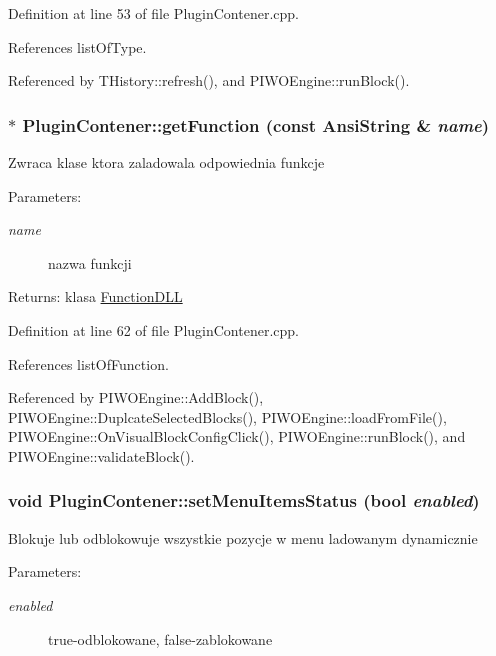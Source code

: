 Definition at line 53 of file PluginContener.cpp.

References listOfType.

Referenced by THistory::refresh(), and PIWOEngine::runBlock().\hypertarget{classPluginContener_8a9049d660fbd61f00913c580df3b314}{
\subsubsection[getFunction]{ $\ast$ PluginContener::getFunction (const AnsiString \& {\em name})}}
\label{classPluginContener_8a9049d660fbd61f00913c580df3b314}


Zwraca klase ktora zaladowala odpowiednia funkcje \begin{Desc}
\item[Parameters:]
\begin{description}
\item[{\em name}]nazwa funkcji \end{description}
\end{Desc}
\begin{Desc}
\item[Returns:]klasa \hyperlink{classFunctionDLL}{FunctionDLL} \end{Desc}


Definition at line 62 of file PluginContener.cpp.

References listOfFunction.

Referenced by PIWOEngine::AddBlock(), PIWOEngine::DuplcateSelectedBlocks(), PIWOEngine::loadFromFile(), PIWOEngine::OnVisualBlockConfigClick(), PIWOEngine::runBlock(), and PIWOEngine::validateBlock().\hypertarget{classPluginContener_e8efe6e2f12f6b67bd651c712aaf3b47}{
\subsubsection[setMenuItemsStatus]{\setlength{\rightskip}{0pt plus 5cm}void PluginContener::setMenuItemsStatus (bool {\em enabled})}}
\label{classPluginContener_e8efe6e2f12f6b67bd651c712aaf3b47}


Blokuje lub odblokowuje wszystkie pozycje w menu ladowanym dynamicznie \begin{Desc}
\item[Parameters:]
\begin{description}
\item[{\em enabled}]true-odblokowane, false-zablokowane \end{description}
\end{Desc}



